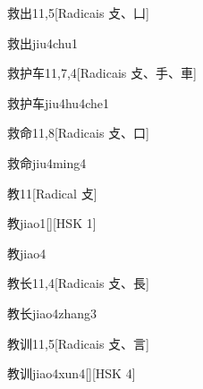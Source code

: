 \begin{entry}{救出}{11,5}[Radicais ⽁、⼐]
  \begin{phonetics}{救出}{jiu4chu1}
  \end{phonetics}
\end{entry}

\begin{entry}{救护车}{11,7,4}[Radicais ⽁、⼿、⾞]
  \begin{phonetics}{救护车}{jiu4hu4che1}
  \end{phonetics}
\end{entry}

\begin{entry}{救命}{11,8}[Radicais ⽁、⼝]
  \begin{phonetics}{救命}{jiu4ming4}
  \end{phonetics}
\end{entry}

\begin{entry}{教}{11}[Radical ⽁]
  \begin{phonetics}{教}{jiao1}[][HSK 1]
  \end{phonetics}
  \begin{phonetics}{教}{jiao4}
  \end{phonetics}
\end{entry}

\begin{entry}{教长}{11,4}[Radicais ⽁、⾧]
  \begin{phonetics}{教长}{jiao4zhang3}
  \end{phonetics}
\end{entry}

\begin{entry}{教训}{11,5}[Radicais ⽁、⾔]
  \begin{phonetics}{教训}{jiao4xun4}[][HSK 4]
  \end{phonetics}
\end{entry}

